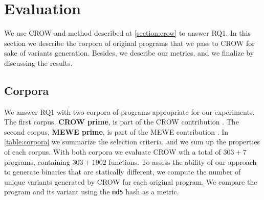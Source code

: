 \section{Evaluation}
\label{section:crow:exp_setup}

We use CROW and method described at \autoref{section:crow} to answer RQ1. In this section we describe the corpora of original programs that we pass to CROW for sake of variants generation. Besides, we describe our metrics, and we finalize by discussing the results.

\subsection{Corpora}
\label{section:crow:corpora}

We answer RQ1 with two corpora of programs appropriate for our experiments. The first corpus, \textbf{CROW prime}, is part of the CROW contribution \cite{}. The second corpus, \textbf{MEWE prime}, is part of the MEWE contribution \cite{}. In \autoref{table:corpora} we summarize the selection criteria, and we sum up the properties of each corpus. With both corpora we evaluate CROW wih a total of $303 + 7$ programs, containing $303 + 1902$ functions. To assess the ability of our approach to generate \wasm binaries that are statically different, we compute the number of unique variants generated by CROW for each original program. 
We compare the \wasm program and its variant using the \texttt{md5} hash as a metric. 


